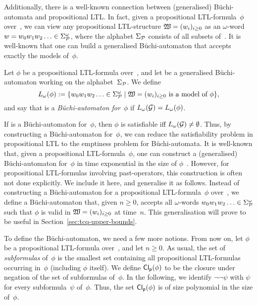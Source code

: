 Additionally, there is a well-known connection between (generalised)
Büchi-automata and propositional LTL\@.  In fact, given a propositional
LTL-formula~$\phi$ over~\Pmc, we can view any propositional LTL-structure
$\mathfrak{W}=(w_i)_{i\ge 0}$ as an $\omega$-word
$w=w_0w_1w_2\dotso\in\Sigma_\mathcal{P}^\omega$, where the alphabet $\Sigma_\mathcal{P}$
consists of all subsets of~\Pmc.  It is well-known that one can build a
generalised Büchi-automaton that accepts exactly the models of~$\phi$.

\begin{definition}\label{def:ba-for-ltl}
    Let $\phi$ be a propositional LTL-formula over~\Pmc, and let \Gmc be a
    generalised Büchi-automaton working on the alphabet~$\Sigma_\mathcal{P}$.  We
    define
    \[L_\omega(\phi):=\{w_0w_1w_2\dotso\in\Sigma_\Pmc^\omega\mid%
        \Wmf=(w_i)_{i\ge 0}\ \text{is a model of $\phi$}\},\]
    and say that \Gmc is a \emph{Büchi-automaton for~$\phi$} if
    $L_\omega(\mathcal{G})=L_\omega(\phi)$.
\end{definition}

\noindent
If \Gmc is a Büchi-automaton for~$\phi$, then $\phi$ is satisfiable iff
$L_\omega(\mathcal{G})\ne\emptyset$.  Thus, by constructing a Büchi-automaton
for~$\phi$, we can reduce the satisfiability problem in propositional LTL to the
emptiness problem for Büchi-automata.
%
It is well-known that, given a propositional LTL-formula~$\phi$, one can
construct a (generalised) Büchi-automaton for~$\phi$ in time exponential in the
size of $\phi$~\cite{WoVS-FOCS83,VaWo-IC94,LiPZ-CLP85}.
%
However, for propositional LTL-formulas involving past-operators, this
construction is often not done explicitly.  We include it here, and generalise
it as follows.  Instead of constructing a Büchi-automaton for a propositional
LTL-formula~$\phi$ over~\Pmc, we define a Büchi-automaton that, given $n\ge 0$,
accepts all $\omega$-words $w_0w_1w_2\dotso\in\Sigma_\mathcal{P}^\omega$ such that
$\phi$ is valid in $\mathfrak{W}=(w_i)_{i\ge 0}$ at time~$n$.  This generalisation will
prove to be useful in Section~\ref{sec:tcq-upper-bounds}.

To define the Büchi-automaton, we need a few more notions.  From now on, let
$\phi$ be a propositional LTL-formula over~\Pmc, and let $n\ge 0$.  As usual,
the set of \emph{subformulas} of~$\phi$ is the smallest set containing all
propositional LTL-formulas occurring in~$\phi$ (including $\phi$ itself).
%
We define $\operatorname{\mathsf{Cl_p}}(\phi)$ to be the closure under negation of the set of
subformulas of~$\phi$.  In the following, we identify $\lnot\lnot\psi$ with
$\psi$ for every subformula~$\psi$ of~$\phi$.  Thus, the set $\operatorname{\mathsf{Cl_p}}(\phi)$ is of
size polynomial in the size of~$\phi$.

